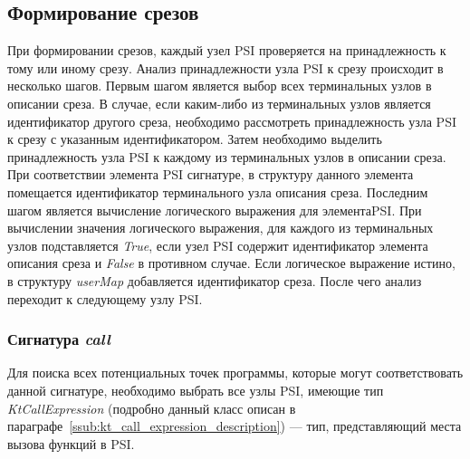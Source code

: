 \subsection{Формирование срезов}
\label{ssec:pointcut_creation_description}
При формировании срезов, каждый узел PSI проверяется на принадлежность к тому или иному срезу.
Анализ принадлежности узла PSI к срезу происходит в несколько шагов.
Первым шагом является выбор всех терминальных узлов в описании среза.
В случае, если каким-либо из терминальных узлов является идентификатор другого
среза, необходимо рассмотреть принадлежность узла PSI к срезу с указанным идентификатором.
Затем необходимо выделить принадлежность узла PSI к каждому из терминальных узлов в описании среза.
При соответствии элемента PSI сигнатуре, в структуру  данного элемента помещается идентификатор терминального узла описания среза.
Последним шагом является вычисление логического выражения для элементаPSI.
При вычислении значения логического выражения, для каждого из терминальных узлов
подставляется \textit{True}, если узел PSI содержит идентификатор элемента описания среза и \textit{False} в противном случае.
Если логическое выражение истино, в структуру \textit{userMap} добавляется идентификатор среза.
После чего анализ переходит к следующему узлу PSI.
\subsubsection{Сигнатура \textit{call}}
\label{ssub:call_signature_mark}
Для поиска всех потенциальных точек программы, которые могут соответствовать
данной сигнатуре, необходимо выбрать все узлы PSI, имеющие тип
\textit{KtCallExpression} (подробно данный класс описан в параграфе~\ref{ssub:kt_call_expression_description}) --- тип, представляющий места вызова
функций в PSI.

